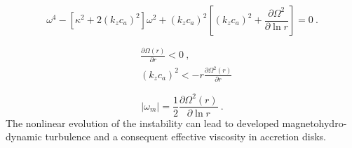\documentclass[12pt,a4paper]{article}
\begin{document}
\begin{equation}
\omega^4 -\left[\kappa^2 +2(k_z c_a)^2 \right]\omega^2 +(k_z c_a)^2 \left[(k_z c_a)^2 + \frac{\partial \Omega^2}{\partial \ln r} \right] = 0 ~.
\end{equation}

\begin{align}
& \frac{\partial \Omega(r)}{\partial r} < 0 ~, \\
& (k_z c_a)^2 < -r \frac{\partial \Omega^2(r)}{\partial  r}
\end{align}

\begin{equation*}
|\omega_m| = \frac{1}{2} \frac{\partial \Omega^2(r)}{\partial \ln r} ~.
\end{equation*}
The nonlinear evolution of the instability can lead to developed magnetohydro- dynamic turbulence and a consequent effective viscosity in accretion disks.











\end{document}
